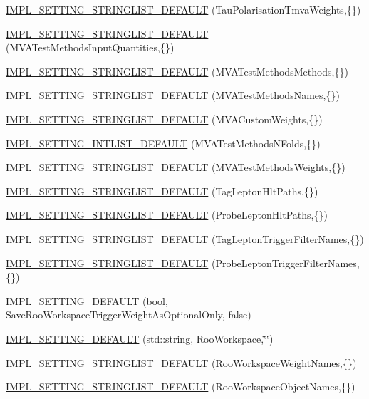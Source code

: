 \begin{DoxyCompactItemize}
\hyperlink{classHttSettings_a11d5b78375d1a35dd36ac11257384dc6}{IMPL\_\-SETTING\_\-STRINGLIST\_\-DEFAULT} (TauPolarisationTmvaWeights,\{\})
\item 
\hyperlink{classHttSettings_a35ce0fe901e69d374becbe5f16dc2789}{IMPL\_\-SETTING\_\-STRINGLIST\_\-DEFAULT} (MVATestMethodsInputQuantities,\{\})
\item 
\hyperlink{classHttSettings_a789b96782a5fc48e216ab8b19d39c099}{IMPL\_\-SETTING\_\-STRINGLIST\_\-DEFAULT} (MVATestMethodsMethods,\{\})
\item 
\hyperlink{classHttSettings_a89bebd29ec416dc09e1b25ecc07f1e45}{IMPL\_\-SETTING\_\-STRINGLIST\_\-DEFAULT} (MVATestMethodsNames,\{\})
\item 
\hyperlink{classHttSettings_a344986608f8f7a43084022c2ea3dbff7}{IMPL\_\-SETTING\_\-STRINGLIST\_\-DEFAULT} (MVACustomWeights,\{\})
\item 
\hyperlink{classHttSettings_a3ad9fb1a46b3cefcd55d59cae270079c}{IMPL\_\-SETTING\_\-INTLIST\_\-DEFAULT} (MVATestMethodsNFolds,\{\})
\item 
\hyperlink{classHttSettings_af35f86b3b0858c95f367862b50249a90}{IMPL\_\-SETTING\_\-STRINGLIST\_\-DEFAULT} (MVATestMethodsWeights,\{\})
\item 
\hyperlink{classHttSettings_adb48bb6048ea848b6bc172ece7304d2d}{IMPL\_\-SETTING\_\-STRINGLIST\_\-DEFAULT} (TagLeptonHltPaths,\{\})
\item 
\hyperlink{classHttSettings_a5c858d9a804965e10e80aaee3129ec7c}{IMPL\_\-SETTING\_\-STRINGLIST\_\-DEFAULT} (ProbeLeptonHltPaths,\{\})
\item 
\hyperlink{classHttSettings_a72c155dc0c66286049e0a96fc38d7d58}{IMPL\_\-SETTING\_\-STRINGLIST\_\-DEFAULT} (TagLeptonTriggerFilterNames,\{\})
\item 
\hyperlink{classHttSettings_ac90c3f148c23ca181d8337425966f405}{IMPL\_\-SETTING\_\-STRINGLIST\_\-DEFAULT} (ProbeLeptonTriggerFilterNames,\{\})
\item 
\hyperlink{classHttSettings_a0e185c7c739d7efa8caf9a8449604110}{IMPL\_\-SETTING\_\-DEFAULT} (bool, SaveRooWorkspaceTriggerWeightAsOptionalOnly, false)
\item 
\hyperlink{classHttSettings_a7163f114debc502fabc0a31866245f88}{IMPL\_\-SETTING\_\-DEFAULT} (std::string, RooWorkspace,\char`\"{}\char`\"{})
\item 
\hyperlink{classHttSettings_a8daa9985fff6d954be88d243601b56f8}{IMPL\_\-SETTING\_\-STRINGLIST\_\-DEFAULT} (RooWorkspaceWeightNames,\{\})
\item 
\hyperlink{classHttSettings_a16bc0e064dfe53c5a89b046d5e0081a2}{IMPL\_\-SETTING\_\-STRINGLIST\_\-DEFAULT} (RooWorkspaceObjectNames,\{\})

\end{DoxyCompactItemize}
